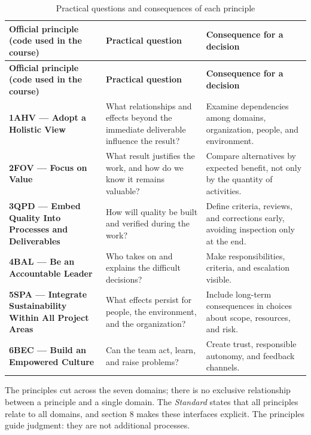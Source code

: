 \documentclass[11pt,a4paper]{article}
\makeatletter
\newcommand{\refnum}[1]{\csname refnum@#1\endcsname}
\newcommand{\cit}[1]{[\refnum{#1}]}
\newcommand{\SingleSpacing}{}
\newcommand{\fontetab}[1]{\par\vspace{3pt}{\small\noindent Source: #1\par}}
\makeatother
\begin{document}
\begingroup\SingleSpacing\small
\begin{longtable}{@{}>{\raggedright\arraybackslash}p{}>{\raggedright\arraybackslash}p{}>{\raggedright\arraybackslash}p{}@{}}
\caption{Practical questions and consequences of each principle}\label{tab:t3}\\
\toprule
\textbf{Official principle (code used in the course)} & \textbf{Practical question} & \textbf{Consequence for a decision}\\
\midrule
\endfirsthead
\toprule
\textbf{Official principle (code used in the course)} & \textbf{Practical question} & \textbf{Consequence for a decision}\\
\midrule
\endhead
\bottomrule
\endfoot
\bottomrule
\endlastfoot
\textbf{1AHV — Adopt a Holistic View} & What relationships and effects beyond the immediate deliverable influence the result? & Examine dependencies among domains, organization, people, and environment.\\[3pt]
\textbf{2FOV — Focus on Value} & What result justifies the work, and how do we know it remains valuable? & Compare alternatives by expected benefit, not only by the quantity of activities.\\[3pt]
\textbf{3QPD — Embed Quality Into Processes and Deliverables} & How will quality be built and verified during the work? & Define criteria, reviews, and corrections early, avoiding inspection only at the end.\\[3pt]
\textbf{4BAL — Be an Accountable Leader} & Who takes on and explains the difficult decisions? & Make responsibilities, criteria, and escalation visible.\\[3pt]
\textbf{5SPA — Integrate Sustainability Within All Project Areas} & What effects persist for people, the environment, and the organization? & Include long-term consequences in choices about scope, resources, and risk.\\[3pt]
\textbf{6BEC — Build an Empowered Culture} & Can the team act, learn, and raise problems? & Create trust, responsible autonomy, and feedback channels.\\[3pt]
\end{longtable}
\endgroup
\fontetab{Prepared by the authors (2026), based on \cit{pmi}.}

The principles cut across the seven domains; there is no exclusive relationship between a principle and a single domain. The \textit{Standard} states that all principles relate to all domains, and section 8 makes these interfaces explicit. The principles guide judgment: they are not additional processes.
\end{document}

